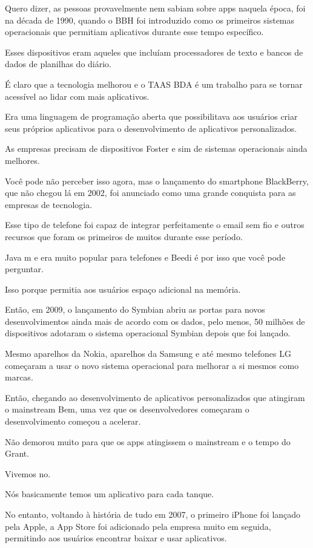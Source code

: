Quero dizer, as pessoas provavelmente nem sabiam sobre apps naquela época, foi na década de 1990, quando o BBH foi introduzido como os primeiros sistemas operacionais que permitiam aplicativos durante esse tempo específico.

Esses dispositivos eram aqueles que incluíam processadores de texto e bancos de dados de planilhas do diário.

É claro que a tecnologia melhorou e o TAAS BDA é um trabalho para se tornar acessível ao lidar com mais aplicativos.

Era uma linguagem de programação aberta que possibilitava aos usuários criar seus próprios aplicativos para o desenvolvimento de aplicativos personalizados.

As empresas precisam de dispositivos Foster e sim de sistemas operacionais ainda melhores.

Você pode não perceber isso agora, mas o lançamento do smartphone BlackBerry, que não chegou lá em 2002, foi anunciado como uma grande conquista para as empresas de tecnologia.

Esse tipo de telefone foi capaz de integrar perfeitamente o email sem fio e outros recursos que foram os primeiros de muitos durante esse período.

Java m e era muito popular para telefones e Beedi é por isso que você pode perguntar.

Isso porque permitia aos usuários espaço adicional na memória.

Então, em 2009, o lançamento do Symbian abriu as portas para novos desenvolvimentos ainda mais de acordo com os dados, pelo menos, 50 milhões de dispositivos adotaram o sistema operacional Symbian depois que foi lançado.

Mesmo aparelhos da Nokia, aparelhos da Samsung e até mesmo telefones LG começaram a usar o novo sistema operacional para melhorar a si mesmos como marcas.

Então, chegando ao desenvolvimento de aplicativos personalizados que atingiram o mainstream Bem, uma vez que os desenvolvedores começaram o desenvolvimento começou a acelerar.

Não demorou muito para que os apps atingissem o mainstream e o tempo do Grant.

Vivemos no.

Nós basicamente temos um aplicativo para cada tanque.

No entanto, voltando à história de tudo em 2007, o primeiro iPhone foi lançado pela Apple, a App Store foi adicionado pela empresa muito em seguida, permitindo aos usuários encontrar baixar e usar aplicativos.


